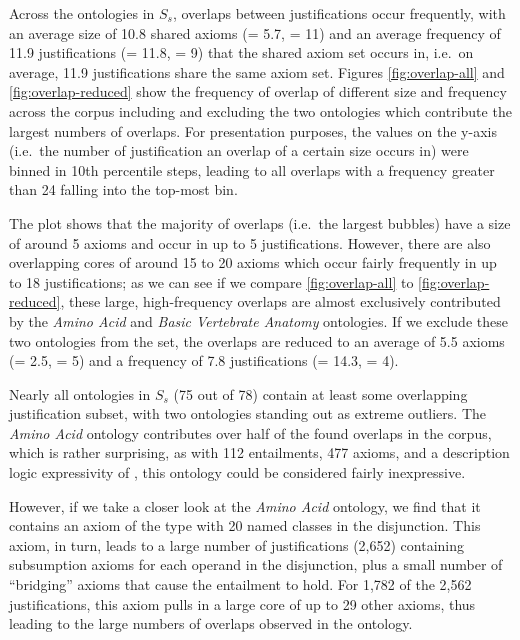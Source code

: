 Across the ontologies in $S_{s}$, overlaps between justifications occur frequently, with an average size of 10.8 shared axioms (\sdev = 5.7, \median = 11) and an average frequency of 11.9 justifications (\sdev = 11.8, \median = 9) that the shared axiom set occurs in, i.e.\ on average, 11.9 justifications share the same axiom set. Figures \ref{fig:overlap-all} and \ref{fig:overlap-reduced} show the frequency of overlap of different size and frequency across the corpus including and excluding the two ontologies which contribute the largest numbers of overlaps. For presentation purposes, the values on the y-axis (i.e.\ the number of justification an overlap of a certain size occurs in) were binned in 10th percentile steps, leading to all overlaps with a frequency greater than 24 falling into the top-most bin. 

The plot shows that the majority of overlaps (i.e.\ the largest bubbles) have a size of around 5 axioms and occur in up to 5 justifications. However, there are also overlapping cores of around 15 to 20 axioms which occur fairly frequently in up to 18 justifications; as we can see if we compare \ref{fig:overlap-all} to \ref{fig:overlap-reduced}, these large, high-frequency overlaps are almost exclusively contributed by the \emph{Amino Acid} and \emph{Basic Vertebrate Anatomy} ontologies. If we exclude these two ontologies from the set, the overlaps are reduced to an average of 5.5 axioms (\sdev = 2.5, \median = 5) and a frequency of 7.8 justifications (\sdev = 14.3, \median = 4).

Nearly all ontologies in $S_{s}$ (75 out of 78) contain at least some overlapping justification subset, with two ontologies standing out as extreme outliers.  The \emph{Amino Acid} ontology contributes over half of the found overlaps in the corpus, which is rather surprising, as with 112 entailments, 477 axioms, and a description logic expressivity of , this ontology could be considered fairly inexpressive.

However, if we take a closer look at the \emph{Amino Acid} ontology, we find that it contains an axiom of the type  with 20 named classes in the disjunction. This axiom, in turn, leads to a large number of justifications (2,652) containing subsumption axioms for each operand in the disjunction, plus a small number of \enquote{bridging} axioms that cause the entailment to hold. For 1,782 of the 2,562 justifications, this axiom pulls in a large core of up to 29 other axioms, thus leading to the large numbers of overlaps observed in the ontology.

